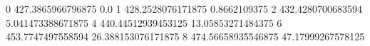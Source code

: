 0 427.3865966796875 0.0
1 428.2528076171875 0.8662109375
2 432.4280700683594 5.041473388671875
4 440.44512939453125 13.05853271484375
6 453.7747497558594 26.388153076171875
8 474.56658935546875 47.17999267578125
